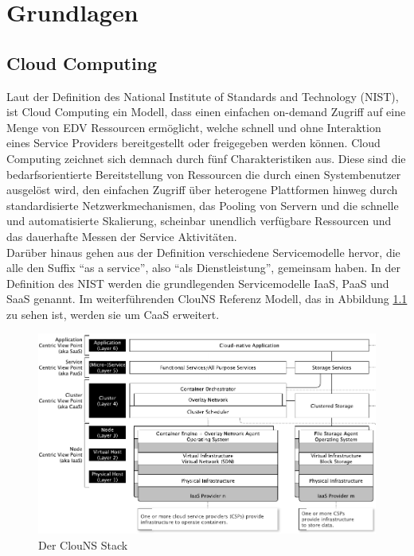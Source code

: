 \chapter{Grundlagen}

\section{Cloud Computing}
Laut der Definition des National Institute of Standards and Technology (NIST), ist Cloud Computing ein Modell, dass einen einfachen on-demand Zugriff auf eine Menge von EDV Ressourcen ermöglicht, welche schnell und ohne Interaktion eines Service Providers bereitgestellt oder freigegeben werden können\cite{mell_nist_2011}.
Cloud Computing zeichnet sich demnach durch fünf Charakteristiken aus. Diese sind die bedarfsorientierte Bereitstellung von Ressourcen die durch einen Systembenutzer ausgelöst wird, den einfachen Zugriff über heterogene Plattformen hinweg durch standardisierte Netzwerkmechanismen, das Pooling von Servern und die schnelle und automatisierte Skalierung, scheinbar unendlich verfügbare Ressourcen und das dauerhafte Messen der Service Aktivitäten. \\
Darüber hinaus gehen aus der Definition verschiedene Servicemodelle hervor, die alle den Suffix "`as a service"', also "`als Dienstleistung"', gemeinsam haben. In der Definition des NIST werden die grundlegenden Servicemodelle IaaS, PaaS und SaaS genannt. Im weiterführenden ClouNS Referenz Modell\cite{kratzke_clouns_2016}, das in Abbildung \ref{fig:clouNS} zu sehen ist, werden sie um CaaS erweitert. \\

\begin{figure}[H]
    \includegraphics[width=\textwidth]{img/ClouNS_Stack.png}
    \caption[Der ClouNS Stack]{Der ClouNS Stack\cite{kratzke_clouns_2016}}
    \label{fig:clouNS}
\end{figure}

